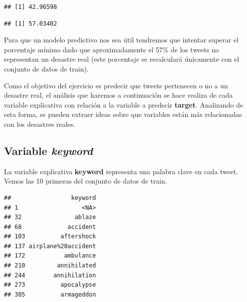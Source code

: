 \documentclass[]{article}
\newenvironment{Shaded}{\begin{snugshade}}{\end{snugshade}}
\newcommand{\DecValTok}[1]{\textcolor[rgb]{0.00,0.00,0.81}{#1}}
\newcommand{\KeywordTok}[1]{\textcolor[rgb]{0.13,0.29,0.53}{\textbf{#1}}}
\newcommand{\NormalTok}[1]{#1}
\newcommand{\OperatorTok}[1]{\textcolor[rgb]{0.81,0.36,0.00}{\textbf{#1}}}
\newcommand{\StringTok}[1]{\textcolor[rgb]{0.31,0.60,0.02}{#1}}
\begin{document}
\begin{verbatim}
## [1] 42.96598
\end{verbatim}

\begin{Shaded}
\end{Shaded}

\begin{verbatim}
## [1] 57.03402
\end{verbatim}

Para que un modelo predictivo nos sea útil tendremos que intentar
superar el porcentaje mínimo dado que aproximadamente el 57\% de los
tweets no representan un desastre real (este porcentaje se recalculará
únicamente con el conjunto de datos de train).

Como el objetivo del ejercicio es predecir que tweets pertenecen o no a
un desastre real, el análisis que haremos a continuación se hace realiza
de cada variable explicativa con relación a la variable a predecir
\textbf{target}. Analizando de esta forma, se pueden extraer ideas sobre
que variables están más relacionadas con los desastres reales.

\hypertarget{variable-keyword}{%
\subsection{\texorpdfstring{Variable
\emph{keyword}}{Variable keyword}}\label{variable-keyword}}

La variable explicativa \textbf{keyword} representa una palabra clave en
cada tweet. Vemos las 10 primeras del conjunto de datos de train.

\begin{Shaded}
\end{Shaded}

\begin{verbatim}
##                 keyword
## 1                  <NA>
## 32               ablaze
## 68             accident
## 103          aftershock
## 137 airplane%20accident
## 172           ambulance
## 210         annihilated
## 244        annihilation
## 273          apocalypse
## 305          armageddon
\end{verbatim}
\end{document}
